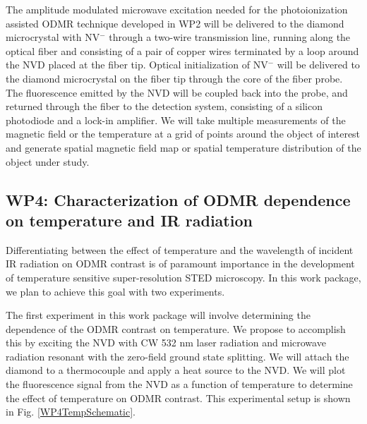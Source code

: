 \documentclass[11pt]{article}
\begin{document}
The amplitude modulated microwave excitation needed for the photoionization assisted ODMR technique developed in WP2 will be 
delivered to the diamond microcrystal with NV$^-$ through a two-wire transmission line, running along the 
optical fiber and consisting of a pair of copper wires terminated by a loop around the NVD placed at the fiber 
tip.  Optical initialization of NV$^-$ will be delivered to the diamond microcrystal on the fiber tip through 
the core of the fiber probe. The fluorescence emitted by the NVD will be coupled back into the probe, 
and returned through the fiber to the detection system, consisting of a silicon photodiode and a lock-in 
amplifier.  We will take multiple measurements of the magnetic field or the temperature at a grid of points 
around the object of interest and generate spatial magnetic field map or spatial temperature distribution of the 
object under study. 

\subsection{WP4: Characterization of ODMR dependence on temperature and IR radiation}

Differentiating between the effect of temperature and the wavelength of incident IR radiation on ODMR contrast 
is of paramount importance in the development of temperature sensitive super-resolution STED microscopy.  In 
this work package, we plan to achieve this goal with two experiments. 

The first experiment in this work package will involve determining the dependence of the ODMR contrast on
temperature. We propose to accomplish this by exciting the NVD with CW 532 nm laser radiation and microwave
radiation resonant with the zero-field ground state splitting.  We will attach the diamond to a thermocouple and
apply a heat source to the NVD.  We will plot the fluorescence signal from the NVD as a function of temperature
to determine the effect of temperature on ODMR contrast. This experimental setup is shown in Fig. 
\ref{WP4TempSchematic}.
\end{document}
